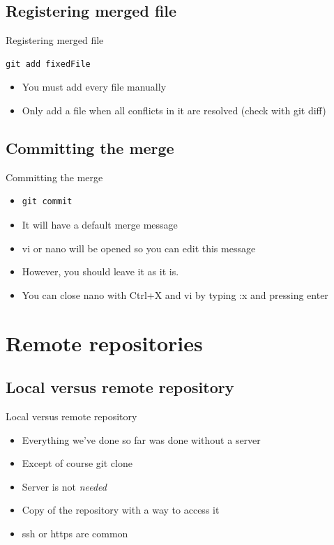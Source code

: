 \documentclass[10pt,a4paper]{beamer}
\begin{document}
\subsection{Registering merged file}
\begin{frame}[fragile]{Registering merged file}
\begin{verbatim}
git add fixedFile
\end{verbatim}
\begin{itemize}
\item You must add every file manually
\item Only add a file when all conflicts in it are resolved (check with git diff)

\end{itemize}
\end{frame}

\subsection{Committing the merge}
\begin{frame}[fragile]{Committing the merge}
\begin{itemize}
\item \begin{verbatim}git commit\end{verbatim}
\item It will have a default merge message
\item vi or nano will be opened so you can edit this message
\item However, you should leave it as it is.
\item You can close nano with Ctrl+X and vi by typing :x and pressing enter
\end{itemize}
\end{frame}


\section{Remote repositories}

\subsection{Local versus remote repository}
\begin{frame}{Local versus remote repository}
\begin{itemize}
\item Everything we've done so far was done without a server
\item Except of course git clone
\item Server is not \textit{needed}
\item Copy of the repository with a way to access it
\item ssh or https are common
\end{itemize}
\end{frame}
\end{document}
